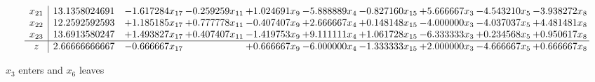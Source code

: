 \documentclass[10pt]{article}
\begin{document}
\[\begin{array}{c| c c@{\hskip 2pt} c@{\hskip 2pt} c@{\hskip 2pt} c@{\hskip 2pt} c@{\hskip 2pt} c@{\hskip 2pt} c@{\hskip 2pt} c@{\hskip 2pt} }
 x_{21}   &  13.1358024691 & -1.617284 x_{17} & -0.259259 x_{11} & + 1.024691 x_{9} & -5.888889 x_{4} & -0.827160 x_{15} & + 5.666667 x_{3} & -4.543210 x_{5} & -3.938272 x_{8}\\
 x_{22}   &  12.2592592593 & + 1.185185 x_{17} & + 0.777778 x_{11} & -0.407407 x_{9} & + 2.666667 x_{4} & + 0.148148 x_{15} & -4.000000 x_{3} & -4.037037 x_{5} & + 4.481481 x_{8}\\
 x_{23}   &  13.6913580247 & + 1.493827 x_{17} & + 0.407407 x_{11} & -1.419753 x_{9} & + 9.111111 x_{4} & + 1.061728 x_{15} & -6.333333 x_{3} & + 0.234568 x_{5} & + 0.950617 x_{8}\\
\hline
z    &  2.66666666667 & -0.666667 x_{17} &   & + 0.666667 x_{9} & -6.000000 x_{4} & -1.333333 x_{15} & + 2.000000 x_{3} & -4.666667 x_{5} & + 0.666667 x_{8}\\
\end{array}\]


 $ x_{3} $ enters and $ x_{6} $ leaves 
\end{document}
